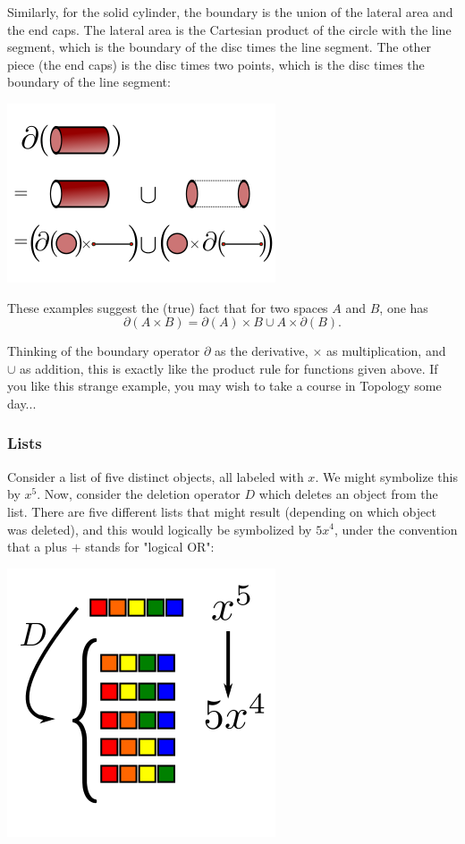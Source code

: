 \documentclass[twoside,openright,titlepage,a4paper]{book}
\begin{document}
\begin{sloppypar}
Similarly, for the solid cylinder, the boundary is the union of the lateral area and the end caps. The lateral area is the Cartesian product of the circle with the line segment, which is the boundary of the disc times the line segment. The other piece (the end caps) is the disc times two points, which is the disc times the boundary of the line segment:
\begin{center}\includegraphics[scale=0.6]{BoundaryProductCylinder}\end{center}

These examples suggest the (true) fact that for two spaces $A$ and $B$, one has \[ \partial(A \times B) = \partial(A) \times B \cup A \times \partial(B). \]

Thinking of the boundary operator $\partial$ as the derivative, $\times$ as multiplication, and $\cup$ as addition, this is exactly like the product rule for functions given above. If you like this strange example, you may wish to take a course in Topology some day...

\subsubsection{Lists}

Consider a list of five distinct objects, all labeled with $x$. We might symbolize this by $x^5$. Now, consider the deletion operator $D$ which deletes an object from the list. There are five different lists that might result (depending on which object was deleted), and this would logically be symbolized by $5x^4$, under the convention that a plus $+$ stands for "logical OR":
\begin{center}\includegraphics[scale=0.6]{ListDelete}\end{center}


\end{sloppypar}
\end{document}
